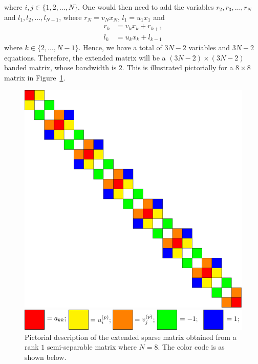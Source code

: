 \documentclass[times]{nlaauth}
\begin{document}
where $i,j \in \{1,2,\ldots,N\}$. One would then need to add the variables $r_2,r_3,\ldots,r_N$ and $l_1,l_2,\ldots,l_{N-1}$, where $r_N = v_N x_N$, $l_1 = u_1x_1$ and
\begin{align}
r_k & = v_kx_k + r_{k+1}\\
l_k & = u_kx_k + l_{k-1}
\end{align}
where $k \in \{2,\ldots,N-1\}$. Hence, we have a total of $3N-2$ variables and $3N-2$ equations. Therefore, the extended matrix will be a $(3N-2) \times (3N-2)$ banded matrix, whose bandwidth is $2$. This is illustrated pictorially for a $8 \times 8$ matrix in Figure~\ref{fig_rank1_semiseparable}.

\begin{figure}[!htbp]
\begin{center}
\includegraphics[scale=0.5]{./images/1termsemiseparable.pdf}
\end{center}
\caption{Pictorial description of the extended sparse matrix obtained from a rank $1$ semi-separable matrix where $N=8$. The color code is as shown below.}
\begin{center}
\includegraphics[scale=0.5]{./images/colorcode.pdf}
\end{center}
\label{fig_rank1_semiseparable}
\end{figure}
\end{document}
